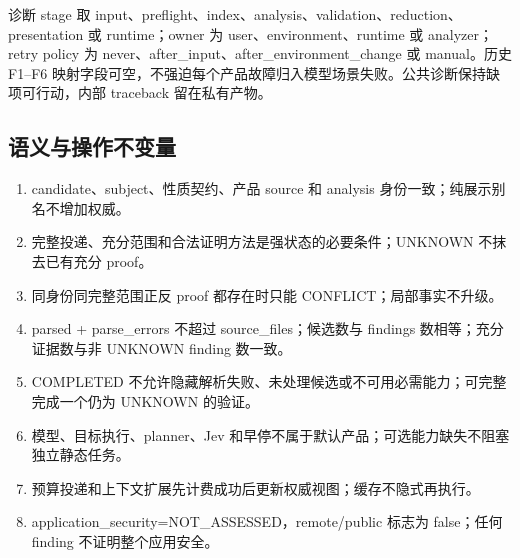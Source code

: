 诊断 stage 取 input、preflight、index、analysis、validation、reduction、presentation 或 runtime；owner 为 user、environment、runtime 或 analyzer；retry policy 为 never、after\_input、after\_environment\_change 或 manual。历史 F1--F6 映射字段可空，不强迫每个产品故障归入模型场景失败。公共诊断保持缺项可行动，内部 traceback 留在私有产物。

\subsection{语义与操作不变量}
\begin{enumerate}
\item candidate、subject、性质契约、产品 source 和 analysis 身份一致；纯展示别名不增加权威。
\item 完整投递、充分范围和合法证明方法是强状态的必要条件；UNKNOWN 不抹去已有充分 proof。
\item 同身份同完整范围正反 proof 都存在时只能 CONFLICT；局部事实不升级。
\item parsed + parse\_errors 不超过 source\_files；候选数与 findings 数相等；充分证据数与非 UNKNOWN finding 数一致。
\item COMPLETED 不允许隐藏解析失败、未处理候选或不可用必需能力；可完整完成一个仍为 UNKNOWN 的验证。
\item 模型、目标执行、planner、Jev 和早停不属于默认产品；可选能力缺失不阻塞独立静态任务。
\item 预算投递和上下文扩展先计费成功后更新权威视图；缓存不隐式再执行。
\item application\_security=NOT\_ASSESSED，remote/public 标志为 false；任何 finding 不证明整个应用安全。
\end{enumerate}
